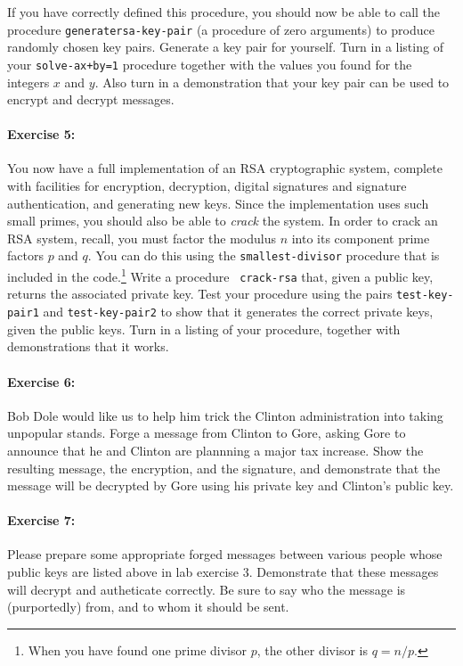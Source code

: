 \noindent
If you have correctly defined this procedure, you should now be able
to call the procedure {\tt generate\-rsa-key-pair} (a procedure of
zero arguments) to produce randomly chosen key pairs.  Generate a key
pair for yourself.  Turn in a listing of your {\tt solve-ax+by=1}
procedure together with the values you found for the integers $x$ and $y$.
Also turn in a demonstration that your key pair can be used to encrypt and
decrypt messages.

\paragraph{Exercise 5:} 
You now have a full implementation of an RSA cryptographic system,
complete with facilities for encryption, decryption, digital
signatures and signature authentication, and generating new keys.
Since the implementation uses such small primes, you should also be able to
{\it crack} the system.  In order to crack an RSA system, recall, you
must factor the modulus $n$ into its component prime factors $p$ and
$q$.  You can do this using the {\tt smallest-divisor} procedure that
is included in the code.\footnote{When you have found one prime
divisor $p$, the other divisor is $q=n/p$.} Write a procedure {\tt
crack-rsa} that, given a public key, returns the associated private
key.  Test your procedure using the pairs {\tt test-key-pair1} and
{\tt test-key-pair2} to show that it generates the correct private
keys, given the public keys.  Turn in a listing of your procedure,
together with demonstrations that it works.


\paragraph{Exercise 6:}
Bob Dole would like us to help him trick the Clinton administration
into taking unpopular stands.  Forge a message from Clinton to Gore,
asking Gore to announce that he and Clinton are plannning a major tax
increase.  Show the resulting message, the encryption, and the
signature, and demonstrate that the message will be decrypted by Gore
using his private key and Clinton's public key.

\paragraph{Exercise 7:}

Please prepare some appropriate forged messages between various people
whose public keys are listed above in lab exercise 3.  Demonstrate that
these messages will decrypt and autheticate correctly.  Be sure to say
who the message is (purportedly) from, and to whom it should be sent.

